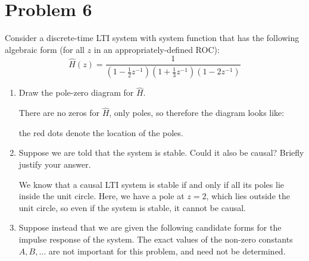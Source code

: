 \documentclass[10pt]{article}
\begin{document}
	\pagebreak
	\section*{Problem 6}
	Consider a discrete-time LTI system with system function that has the following algebraic form (for all \( z \) in 
	an appropriately-defined ROC):
	\[
	\hat{H}(z) = \frac{1}{(1 - \frac{1}{2}z^{-1})(1 + \frac{1}{3}z^{-1})(1 - 2z^{-1})}
	\] 
	\begin{enumerate}[label=\alph*)]
		\item Draw the pole-zero diagram for \( \hat{H} \). 

			\begin{solution}
				There are no zeros for \( \hat{H} \), only poles, so therefore the diagram looks like:
				\begin{center}
				\end{center}
				the red dots denote the location of the poles. 
			\end{solution}
		\item Suppose we are told that the system is stable. Could it also be causal? Briefly justify your answer. 

			\begin{solution}
				We know that a causal LTI system is stable if and only if all its poles lie inside the unit circle. 
				Here, we have a pole at \( z = 2 \), which lies outside the unit circle, so even if the 
				system is stable, it cannot be causal. 
			\end{solution}
		\item Suppose instead that we are given the following candidate forms for the impulse response of the system.
			The exact values of the non-zero constants  \( A, B, \dots \) are not important for this problem, and 
			need not be determined. 


\end{enumerate}
\end{document}
